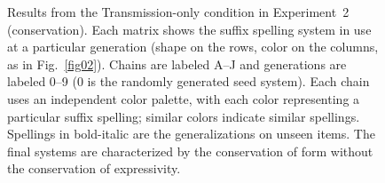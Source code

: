 \documentclass[doc,biblatex]{apa7}
\begin{document}
	\begin{figure}
	\vspace*{2pt}
	\caption{Results from the Transmission-only condition in Experiment~2 (conservation). Each matrix shows the suffix spelling system in use at a particular generation (shape on the rows, color on the columns, as in Fig.~\ref{fig02}). Chains are labeled A--J and generations are labeled 0--9 (0 is the randomly generated seed system). Each chain uses an independent color palette, with each color representing a particular suffix spelling; similar colors indicate similar spellings. Spellings in bold-italic are the generalizations on unseen items. The final systems are characterized by the conservation of form without the conservation of expressivity.}
	\label{fig09}
	\end{figure}
\end{document}
